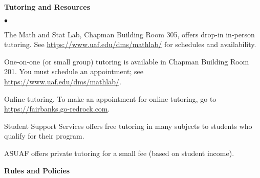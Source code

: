 \documentclass[12pt]{article}
\renewcommand{\emph}[1]{\textsf{\textbf{#1}}}
\newcommand{\localhead}[1]{\par\smallskip\textbf{#1}\nobreak\\}%
\def\heading#1{\localhead{\large\emph{#1}}}
\def\subheading#1{\localhead{\emph{#1}}}
\newenvironment{clist}%
{\bgroup\parskip 0pt\begin{list}{$\bullet$}{\partopsep 4pt\topsep 0pt\itemsep -2pt}}%
{\end{list}\egroup}%
\begin{document}
\heading{Tutoring and Resources}
\vskip -30pt\strut
\begin{clist}
	\item The Math and Stat Lab, Chapman Building Room 305, offers drop-in in-person tutoring. 
	See \url{https://www.uaf.edu/dms/mathlab/} for schedules and availability.
	\item One-on-one (or small group) tutoring is available in 
Chapman Building Room 201. You must schedule an
appointment; see \url{https://www.uaf.edu/dms/mathlab/}.
	\item Online tutoring. To make an appointment for online tutoring, go to \url{https://fairbanks.go-redrock.com}.
	\item Student Support Services offers free tutoring in many subjects to students who qualify for their program.
	\item ASUAF offers private tutoring for a small fee (based on student income).
\end{clist}

\heading{Rules and Policies}
\vskip -20pt


\end{document}
